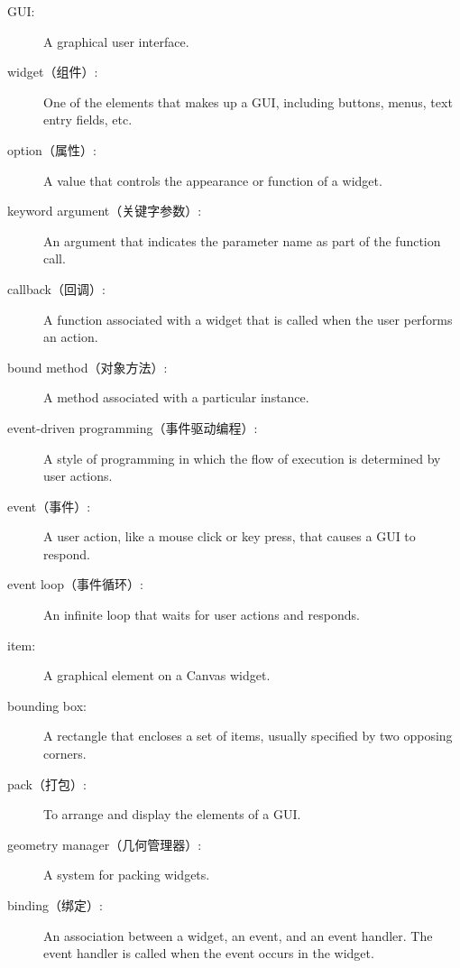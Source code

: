 \documentclass[10pt]{book}
\begin{document}
\begin{CJK}{UTF8}{gbsn}
\begin{description}

\item[GUI:] A graphical user interface.

\item[widget（组件）:] One of the elements that makes up a GUI, including
buttons, menus, text entry fields, etc. 

\item[option（属性）:] A value that controls the appearance or function of
a widget.

\item[keyword argument（关键字参数）:] An argument that indicates the parameter
name as part of the function call.

\item[callback（回调）:] A function associated with a widget that is
called when the user performs an action.

\item[bound method（对象方法）:] A method associated with a particular instance.

\item[event-driven programming（事件驱动编程）:] A style of programming in which
the flow of execution is determined by user actions.

\item[event（事件）:] A user action, like a mouse click or key press, that
causes a GUI to respond.

\item[event loop（事件循环）:] An infinite loop that waits for user actions
and responds.

\item[item:] A graphical element on a Canvas widget.

\item[bounding box:] A rectangle that encloses a set of items,
usually specified by two opposing corners.

\item[pack（打包）:] To arrange and display the elements of a GUI.

\item[geometry manager（几何管理器）:] A system for packing widgets.

\item[binding（绑定）:] An association between a widget, an event, and
an event handler.  The event handler is called when the event
occurs in the widget.


\end{description}
\end{CJK}
\end{document}
